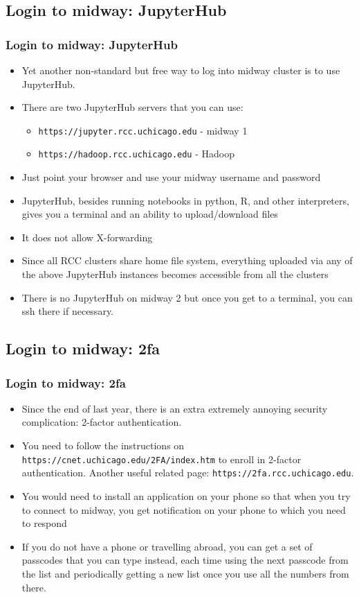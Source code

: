 \documentclass{beamer}
\begin{document}
\subsection{Login to midway: JupyterHub}
\begin{frame}[fragile]
  \frametitle{Login to midway: JupyterHub}
  \begin{itemize}
  \item Yet another non-standard  but free way to log into midway cluster is to use JupyterHub.
  \item There are two JupyterHub servers that you can use:
    \begin{itemize}
      \item {\color{mycolorcli}\verb|https://jupyter.rcc.uchicago.edu|} - midway 1
      \item {\color{mycolorcli}\verb|https://hadoop.rcc.uchicago.edu|} - Hadoop 
    \end{itemize}
    \item Just point your browser and use your midway username and password
    \item JupyterHub, besides running notebooks in python, R, and other interpreters, gives you a terminal and an ability to upload/download files
    \item It does not allow X-forwarding
    \item Since all RCC clusters share home file system, everything uploaded via any of the above JupyterHub instances becomes accessible from all the clusters
    \item There is no JupyterHub on midway 2 but once you get to a terminal, you can ssh there if necessary.
  \end{itemize}
\end{frame}


\subsection{Login to midway: 2fa}
\begin{frame}[fragile]
  \frametitle{Login to midway: 2fa}
  \begin{itemize}
  \item Since the end of last year, there is an extra extremely annoying security complication: {\color{mycolordef}2-factor authentication}.
  \item You need to follow the instructions on {\color{mycolorcli}\verb|https://cnet.uchicago.edu/2FA/index.htm|} to enroll in 2-factor authentication. 
Another useful related page: {\color{mycolorcli}\verb|https://2fa.rcc.uchicago.edu|}.
  \item You would need to install an application on your phone so that when you try to connect to midway, you get notification on your phone to which you need to respond
  \item If you do not have a phone or travelling abroad, you can get a set of passcodes that you can type instead, each time using the next passcode from the list and periodically 
    getting a new list once you use all the numbers from there.
  \end{itemize}
\end{frame}
\end{document}
